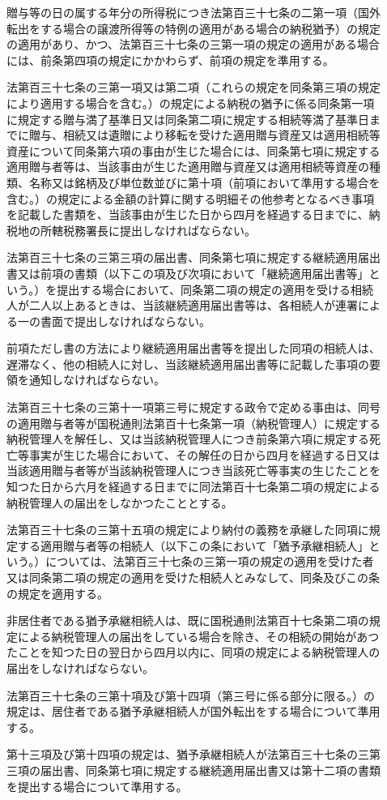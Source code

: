 \documentclass[twocolumn,a4j,10pt]{ltjtarticle}
\begin{document}
\begin{description}
\item[]贈与等の日の属する年分の所得税につき法第百三十七条の二第一項（国外転出をする場合の譲渡所得等の特例の適用がある場合の納税猶予）の規定の適用があり、かつ、法第百三十七条の三第一項の規定の適用がある場合には、前条第四項の規定にかかわらず、前項の規定を準用する。
\item[]法第百三十七条の三第一項又は第二項（これらの規定を同条第三項の規定により適用する場合を含む。）の規定による納税の猶予に係る同条第一項に規定する贈与満了基準日又は同条第二項に規定する相続等満了基準日までに贈与、相続又は遺贈により移転を受けた適用贈与資産又は適用相続等資産について同条第六項の事由が生じた場合には、同条第七項に規定する適用贈与者等は、当該事由が生じた適用贈与資産又は適用相続等資産の種類、名称又は銘柄及び単位数並びに第十項（前項において準用する場合を含む。）の規定による金額の計算に関する明細その他参考となるべき事項を記載した書類を、当該事由が生じた日から四月を経過する日までに、納税地の所轄税務署長に提出しなければならない。
\item[]法第百三十七条の三第三項の届出書、同条第七項に規定する継続適用届出書又は前項の書類（以下この項及び次項において「継続適用届出書等」という。）を提出する場合において、同条第二項の規定の適用を受ける相続人が二人以上あるときは、当該継続適用届出書等は、各相続人が連署による一の書面で提出しなければならない。
\item[]前項ただし書の方法により継続適用届出書等を提出した同項の相続人は、遅滞なく、他の相続人に対し、当該継続適用届出書等に記載した事項の要領を通知しなければならない。
\item[]法第百三十七条の三第十一項第三号に規定する政令で定める事由は、同号の適用贈与者等が国税通則法第百十七条第一項（納税管理人）に規定する納税管理人を解任し、又は当該納税管理人につき前条第六項に規定する死亡等事実が生じた場合において、その解任の日から四月を経過する日又は当該適用贈与者等が当該納税管理人につき当該死亡等事実の生じたことを知つた日から六月を経過する日までに同法第百十七条第二項の規定による納税管理人の届出をしなかつたこととする。
\item[]法第百三十七条の三第十五項の規定により納付の義務を承継した同項に規定する適用贈与者等の相続人（以下この条において「猶予承継相続人」という。）については、法第百三十七条の三第一項の規定の適用を受けた者又は同条第二項の規定の適用を受けた相続人とみなして、同条及びこの条の規定を適用する。
\item[]非居住者である猶予承継相続人は、既に国税通則法第百十七条第二項の規定による納税管理人の届出をしている場合を除き、その相続の開始があつたことを知つた日の翌日から四月以内に、同項の規定による納税管理人の届出をしなければならない。
\item[]法第百三十七条の三第十項及び第十四項（第三号に係る部分に限る。）の規定は、居住者である猶予承継相続人が国外転出をする場合について準用する。
\item[]第十三項及び第十四項の規定は、猶予承継相続人が法第百三十七条の三第三項の届出書、同条第七項に規定する継続適用届出書又は第十二項の書類を提出する場合について準用する。
\end{description}
\end{document}
